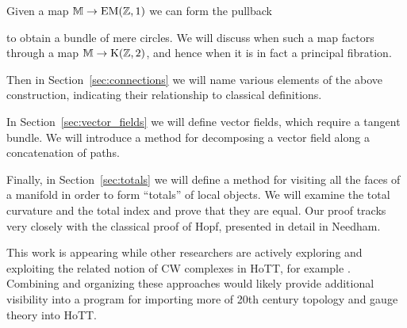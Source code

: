 Given a map \( \mathbb{M}\to\mathrm{EM}(\mathbb{Z},1) \) we can form the pullback
\begin{center}
\end{center}
to obtain a bundle of mere circles. We will discuss when such a map factors through a map \( \mathbb{M}\to \mathrm{K}(\mathbb{Z},2) \), and hence when it is in fact a principal fibration.

Then in Section~\ref{sec:connections} we will name various elements of the above construction, indicating their relationship to classical definitions.

In Section~\ref{sec:vector_fields} we will define vector fields, which require a tangent bundle. We will introduce a method for decomposing a vector field along a concatenation of paths.

Finally, in Section~\ref{sec:totals} we will define a method for visiting all the faces of a manifold in order to form ``totals'' of local objects. We will examine the total curvature and the total index and prove that they are equal. Our proof tracks very closely with the classical proof of Hopf\cite{hopf}, presented in detail in Needham\cite{needham}.

This work is appearing while other researchers are actively exploring and exploiting the related notion of CW complexes in HoTT, for example \cite{ljungstrom_cellular}. Combining and organizing these approaches would likely provide additional visibility into a program for importing more of 20th century topology and gauge theory into HoTT.
